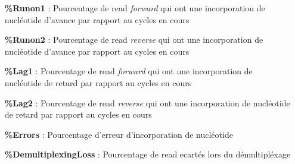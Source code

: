 \begin{itemize}
    \item[\textbf{\%Runon1} :] Pourcentage de read \emph{forward} qui ont une incorporation de nucléotide d'avance par rapport au cycles en cours
    \item[\textbf{\%Runon2} :] Pourcentage de read \emph{reverse} qui ont une incorporation de nucléotide d'avance par rapport au cycles en cours
    \item[\textbf{\%Lag1} :] Pourcentage de read \emph{forward} qui ont une incorporation de nucléotide de retard par rapport au cycles en cours
    \item[\textbf{\%Lag2} :] Pourcentage de read \emph{reverse} qui ont une incorporation de nucléotide de retard par rapport au cycles en cours
    \item[\textbf{\%Errors} :] Pourcentage d'erreur d'incorporation de nucléotide
    \item[\textbf{\%DemultiplexingLoss} :] Pourcentage de read ecartés lors du démultipléxage
\end{itemize}




